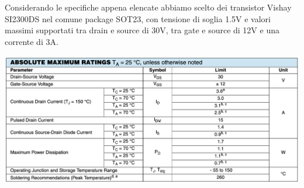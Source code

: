 Considerando le specifiche appena elencate abbiamo scelto dei transistor
Vishay SI2300DS nel comune package SOT23, con tensione di soglia 1.5V e
valori massimi supportati tra drain e source di 30V, tra gate e source
di 12V e una corrente di 3A.

\begin{center}
\includegraphics[scale=0.5]{figures/image69.png}
\captionsetup{type=figure}
\end{center}
